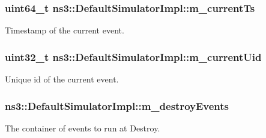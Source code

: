 \subsubsection[{\texorpdfstring{m\+\_\+current\+Ts}{m_currentTs}}]{\setlength{\rightskip}{0pt plus 5cm}uint64\+\_\+t ns3\+::\+Default\+Simulator\+Impl\+::m\+\_\+current\+Ts\hspace{0.3cm}{\ttfamily [private]}}\hypertarget{classns3_1_1DefaultSimulatorImpl_a8895b26ba85208a9f933ffa4ffcd92c2}{}\label{classns3_1_1DefaultSimulatorImpl_a8895b26ba85208a9f933ffa4ffcd92c2}
Timestamp of the current event. 
\subsubsection[{\texorpdfstring{m\+\_\+current\+Uid}{m_currentUid}}]{\setlength{\rightskip}{0pt plus 5cm}uint32\+\_\+t ns3\+::\+Default\+Simulator\+Impl\+::m\+\_\+current\+Uid\hspace{0.3cm}{\ttfamily [private]}}\hypertarget{classns3_1_1DefaultSimulatorImpl_acc741f30f8af775c34e4a97be468c721}{}\label{classns3_1_1DefaultSimulatorImpl_acc741f30f8af775c34e4a97be468c721}
Unique id of the current event. 
\subsubsection[{\texorpdfstring{m\+\_\+destroy\+Events}{m_destroyEvents}}]{ ns3\+::\+Default\+Simulator\+Impl\+::m\+\_\+destroy\+Events\hspace{0.3cm}{\ttfamily [private]}}\hypertarget{classns3_1_1DefaultSimulatorImpl_a5082b32e009450692e94da134efe07f4}{}\label{classns3_1_1DefaultSimulatorImpl_a5082b32e009450692e94da134efe07f4}
The container of events to run at Destroy. 
